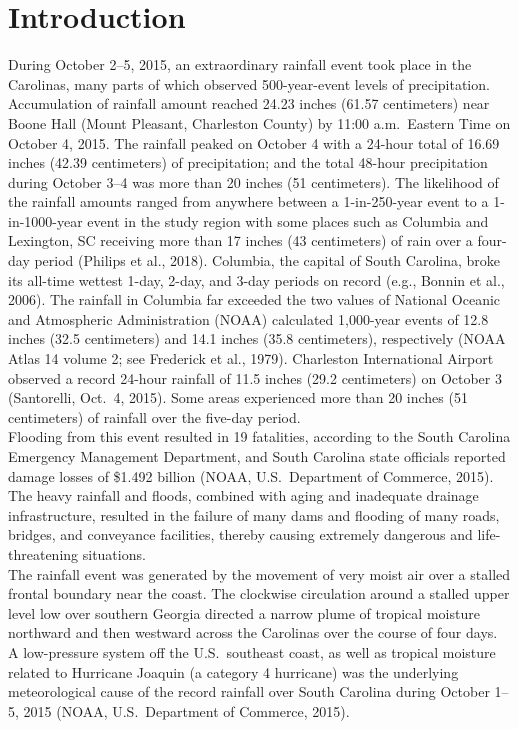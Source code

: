 \documentclass{svjour3}
\renewcommand\hl[1]{#1}
\begin{document}
\section{Introduction}\label{sec:intro}
During October 2--5, 2015, an extraordinary rainfall event took place in the Carolinas, many parts of which observed 500-year-event levels of precipitation.
Accumulation of rainfall amount reached 24.23 inches \hl{(61.57 centimeters)} near Boone Hall (Mount Pleasant, Charleston County) by 11:00 a.m.\ Eastern Time on October 4, 2015.
The rainfall peaked on October 4 with a 24-hour total of 16.69 inches \hl{(42.39 centimeters)} of precipitation;
and the total 48-hour precipitation during October 3--4 was more than 20 inches \hl{(51 centimeters)}.
The likelihood of the rainfall amounts ranged from anywhere between a 1-in-250-year event to a 1-in-1000-year event in the study region with some places such as Columbia and Lexington, SC receiving more than 17 inches \hl{(43 centimeters)} of rain over a four-day period (Philips et al., 2018).
Columbia, the capital of South Carolina, broke its all-time wettest 1-day, 2-day, and 3-day periods on record (e.g., Bonnin et al., 2006).
The rainfall in Columbia far exceeded the two values of National Oceanic and Atmospheric Administration (NOAA) calculated 1,000-year events of 12.8 inches \hl{(32.5 centimeters)} and 14.1 inches \hl{(35.8 centimeters)}, respectively (NOAA Atlas 14 volume 2;
see Frederick et al., 1979).
Charleston International Airport observed a record 24-hour rainfall of 11.5 inches \hl{(29.2 centimeters)} on October 3 (Santorelli, Oct.\ 4, 2015).
Some areas experienced more than 20 inches \hl{(51 centimeters)} of rainfall over the five-day period. \\

Flooding from this event resulted in 19 fatalities, according to the South Carolina Emergency Management Department, and South Carolina state officials reported damage losses of \$1.492 billion (NOAA, U.S.\ Department of Commerce, 2015).
The heavy rainfall and floods, combined with aging and inadequate drainage infrastructure, resulted in the failure of many dams and flooding of many roads, bridges, and conveyance facilities, thereby causing extremely dangerous and life-threatening situations. \\

The rainfall event was generated by the movement of very moist air over a stalled frontal boundary near the coast.
The clockwise circulation around a stalled upper level low over southern Georgia directed a narrow plume of tropical moisture northward and then westward across the Carolinas over the course of four days.
A low-pressure system off the U.S.\ southeast coast,  as well as tropical moisture related to Hurricane Joaquin (a category 4 hurricane) was the underlying meteorological cause of the record rainfall over South Carolina during October 1--5, 2015 (NOAA, U.S.\ Department of Commerce, 2015). \\
\end{document}

